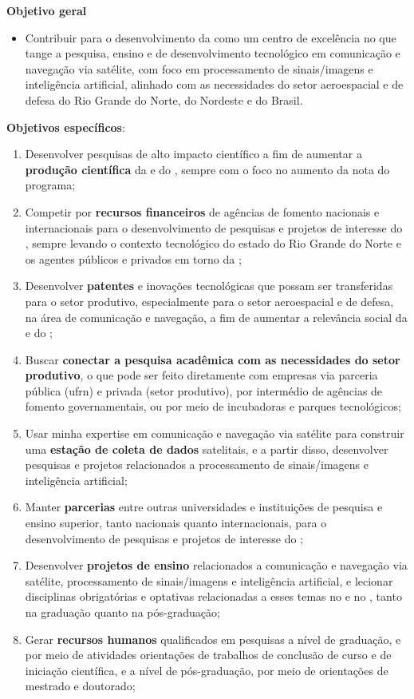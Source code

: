 \documentclass{article}
\begin{document}
\textbf{Objetivo geral}
\begin{itemize}
    \item Contribuir para o desenvolvimento da  como um centro de excelência no que tange a pesquisa, ensino e de desenvolvimento tecnológico em comunicação e navegação via satélite, com foco em processamento de sinais/imagens e inteligência artificial, alinhado com as necessidades do setor aeroespacial e de defesa do Rio Grande do Norte, do Nordeste e do Brasil.
\end{itemize}


\textbf{Objetivos específicos}:
  \begin{enumerate}[label=e\arabic*.]
    \item Desenvolver pesquisas de alto impacto científico a fim de aumentar a \textbf{produção científica} da  e do , sempre com o foco no aumento da nota  do programa;
    \item Competir por \textbf{recursos financeiros} de agências de fomento nacionais e internacionais para o desenvolvimento de pesquisas e projetos de interesse do , sempre levando o contexto tecnológico do estado do Rio Grande do Norte e os agentes públicos e privados em torno da ;
    \item Desenvolver \textbf{patentes} e inovações tecnológicas que possam ser transferidas para o setor produtivo, especialmente para o setor aeroespacial e de defesa, na área de comunicação e navegação, a fim de aumentar a relevância social da  e do ;
    \item Buscar \textbf{conectar a pesquisa acadêmica com as necessidades do setor produtivo}, o que pode ser feito diretamente com empresas via parceria pública (\gls{ufrn}) e privada (setor produtivo), por intermédio de agências de fomento governamentais, ou por meio de incubadoras e parques tecnológicos;
    \item Usar minha expertise em comunicação e navegação via satélite para construir uma \textbf{estação de coleta de dados} satelitais, e a partir disso, desenvolver pesquisas e projetos relacionados a processamento de sinais/imagens e inteligência artificial;
    \item Manter \textbf{parcerias} entre outras universidades e instituições de pesquisa e ensino superior, tanto nacionais quanto internacionais, para o desenvolvimento de pesquisas e projetos de interesse do ;
    \item Desenvolver \textbf{projetos de ensino} relacionados a comunicação e navegação via satélite, processamento de sinais/imagens e inteligência artificial, e lecionar disciplinas obrigatórias e optativas relacionadas a esses temas no  e no , tanto na graduação quanto na pós-graduação;
    \item Gerar \textbf{recursos humanos} qualificados em pesquisas a nível de graduação, e por meio de atividades orientações de trabalhos de conclusão de curso e de iniciação científica, e a nível de pós-graduação, por meio de orientações de mestrado e doutorado;
  \end{enumerate}
\end{document}
